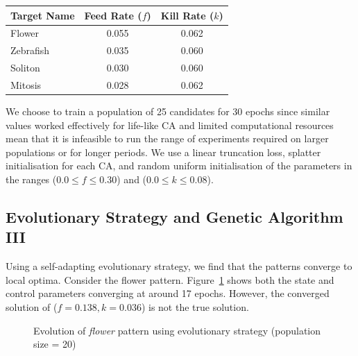 \begin{center}
    \begin{tabular}{ |l|c|c| }
        \hline
        Target Name & Feed Rate ($f$) & Kill Rate ($k$)\\
        \hline
        Flower & 0.055 & 0.062\\
        Zebrafish & 0.035 & 0.060\\
        Soliton & 0.030 & 0.060\\
        Mitosis & 0.028 & 0.062\\
        \hline
    \end{tabular}
\end{center}

We choose to train a population of 25 candidates for 30 epochs since similar values worked effectively for life-like CA and limited computational resources mean that it is infeasible to run the range of experiments required on larger populations or for longer periods. We use a linear truncation loss, splatter initialisation for each CA, and random uniform initialisation of the parameters in the ranges ($0.0 \leq f \leq 0.30$) and ($0.0 \leq k \leq 0.08$).

\subsection{Evolutionary Strategy and Genetic Algorithm III}

Using a self-adapting evolutionary strategy, we find that the patterns converge to local optima. Consider the flower pattern. Figure~\ref{fig:flower-fail} shows both the state and control parameters converging at around 17 epochs. However, the converged solution of ($f = 0.138, k = 0.036$) is not the true solution.\\

\begin{figure}[!h]
\centering
            \hfill
            \hfill
            \hfill
            \hfill
            \caption{Evolution of \textit{flower} pattern using evolutionary strategy (population size = 20)}
\label{fig:flower-fail}
\end{figure}

